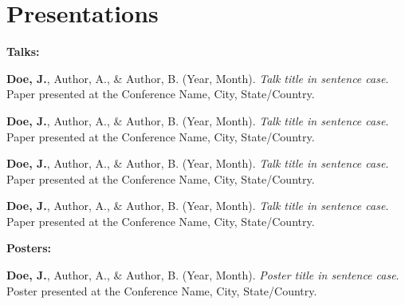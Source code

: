 \section*{Presentations}

\textbf{Talks:}

\begin{citelist}

    \item \textbf{Doe, J.}, Author, A., \& Author, B. (Year, Month).
    \textit{Talk title in sentence case}.
    Paper presented at the Conference Name, City, State/Country.

    \item \textbf{Doe, J.}, Author, A., \& Author, B. (Year, Month).
    \textit{Talk title in sentence case}.
    Paper presented at the Conference Name, City, State/Country.

    \item \textbf{Doe, J.}, Author, A., \& Author, B. (Year, Month).
    \textit{Talk title in sentence case}.
    Paper presented at the Conference Name, City, State/Country.

    \item \textbf{Doe, J.}, Author, A., \& Author, B. (Year, Month).
    \textit{Talk title in sentence case}.
    Paper presented at the Conference Name, City, State/Country.


\end{citelist}

\textbf{Posters:}

\begin{citelist}[resume]

    \item \textbf{Doe, J.}, Author, A., \& Author, B. (Year, Month).
    \textit{Poster title in sentence case}.
    Poster presented at the Conference Name, City, State/Country.

\end{citelist}
